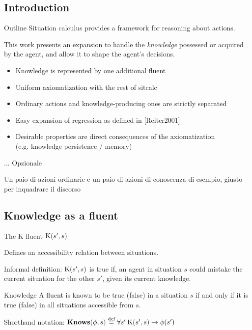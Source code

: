 
\subsection{Introduction}

\begin{frame}{Outline}
    Situation calculus provides a framework for reasoning about actions.

    This work presents an expansion to handle the \textit{knowledge} possessed or acquired by the agent,
    and allow it to shape the agent's decisions.
    \begin{itemize}%
        \item Knowledge is represented by one additional fluent
        \item Uniform axiomatization with the rest of sitcalc
        \item Ordinary actions and knowledge-producing ones are strictly separated
        \item Easy expansion of regression as defined in [Reiter2001]
        \item Desirable properties are direct consequences of the axiomatization \\
                (e.g. knowledge persistence / memory)
    \end{itemize}
\end{frame}

\begin{frame}{...}
    Opzionale

    Un paio di azioni ordinarie e un paio di azioni di conoscenza di esempio, giusto per inquadrare il discorso
\end{frame}

\subsection{Knowledge as a fluent}

\begin{frame}{The K fluent}
    \( \text{K}(s', s) \)

    Defines an accessibility relation between situations.


    Informal definition: \( \text{K}(s',s) \) is true if, an agent in situation \(s\)
    could mistake the current situation for the other \(s'\), given its current knowledge.
\end{frame}

\begin{frame}{Knowledge}
    A fluent is known to be true (false) in a situation \(s\) if and only if it is true (false)
    in all situations accessible from \(s\).

    Shorthand notation: \( \textbf{Knows}(\phi, s) \stackrel{\text{def}}{=} \forall s' \: \text{K}(s',s) \rightarrow \phi(s') \)
\end{frame}
